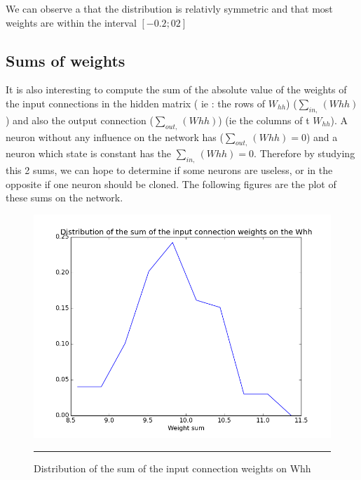 We can observe a that the distribution is relativly symmetric and that most weights are within the interval $[-0.2;02] $

\subsection{Sums of weights}

It is also interesting to compute the sum of the absolute value of the weights of the input connections in the hidden matrix ( ie : the rows of $W_{hh}$) ($\sum_{in,}(Whh)$) and also the output connection ($\sum_{out,}(Whh)$) (ie the columns of t $W_{hh} $). A neuron without any influence on the network has ($\sum_{out,}(Whh) = 0$) and a neuron which state is constant has the $\sum_{in,}(Whh) = 0$. Therefore by studying this 2 sums, we can hope to determine if some neurons are useless, or in the opposite if one neuron should be cloned.
The following figures are the plot of these sums on the network. 

\begin{figure}[htbp]
    \centering
    \includegraphics[scale=0.4]{Figures/input_sum_weight_distribution.png}
    \rule{35em}{0.5pt}
    \caption[Distribution of the sum of the input connection weights on Whh]{Distribution of the sum of the input connection weights on Whh}
    \label{fig:input_sum}
\end{figure}


